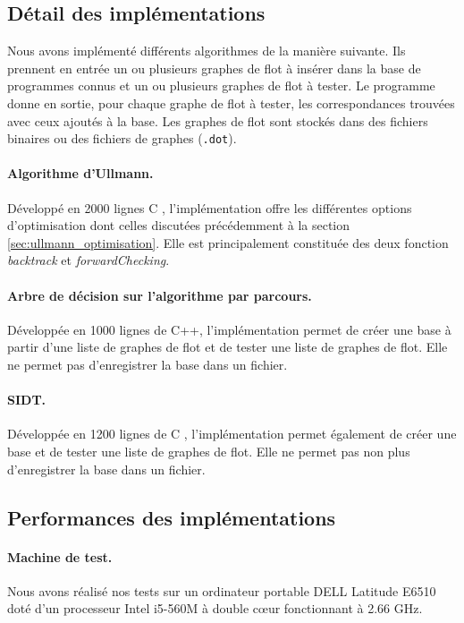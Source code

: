 \subsection{Détail des implémentations}
Nous avons implémenté différents algorithmes de la manière suivante. Ils prennent en entrée un ou plusieurs graphes de flot à insérer dans la base de programmes connus et un ou plusieurs graphes de flot à tester.
Le programme donne en sortie, pour chaque graphe de flot à tester, les correspondances trouvées avec ceux ajoutés à la base.
Les graphes de flot sont stockés dans des fichiers binaires ou des fichiers de graphes (\texttt{.dot}).

\paragraph{Algorithme d'Ullmann.}
Développé en 2000 lignes C \cite{graphbinalgo}, l'implémentation offre les différentes options d'optimisation dont celles discutées précédemment à la section \ref{sec:ullmann_optimisation}.
Elle est principalement constituée des deux fonction \emph{backtrack} et \emph{forwardChecking}.

\paragraph{Arbre de décision sur l'algorithme par parcours.}
Développée en 1000 lignes de C++, l'implémentation permet de créer une base à partir d'une liste de graphes de flot et de tester une liste de graphes de flot. Elle ne permet pas d'enregistrer la base dans un fichier.

\paragraph{SIDT.}
Développée en 1200 lignes de C \cite{SIDT}, l'implémentation permet également de créer une base et de tester une liste de graphes de flot. Elle ne permet pas non plus d'enregistrer la base dans un fichier.


\subsection{Performances des implémentations}
\paragraph{Machine de test.}
Nous avons réalisé nos tests sur un ordinateur portable DELL Latitude E6510 doté d'un processeur Intel i5-560M à double c\oe ur fonctionnant à 2.66 GHz.

